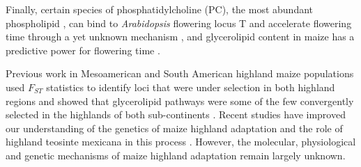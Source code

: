 \documentclass[9pt,twocolumn,twoside,lineno]{BioRxiv}
\begin{document}
Finally, certain species of phosphatidylcholine (PC), the most abundant phospholipid \cite{Gu2017-nd}, can bind to \textit{Arabidopsis} flowering locus T and accelerate flowering time through a yet unknown mechanism \cite{Nakamura2014-qf}, and glycerolipid content in maize has a  predictive power for flowering time \cite{Riedelsheimer2013-bd}. 


Previous work in Mesoamerican and South American highland maize populations used $F_{ST}$ statistics to identify loci that were under selection in both highland regions and showed that glycerolipid pathways were some of the few convergently selected in the highlands of both sub-continents  \cite{Takuno2015-uj}.
Recent studies \cite{Wang2020-mp, Takuno2015-uj, Crow2020-gene} have improved our understanding of the genetics of maize highland adaptation and the role of highland teosinte mexicana in this process \cite{Hufford2013-gs, Lauter2004-eq, pyhajarvi2013}.
However, the molecular, physiological and  genetic mechanisms of maize highland adaptation remain largely unknown.
\end{document}

